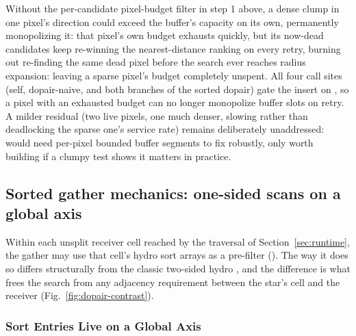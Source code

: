 Without the
per-candidate pixel-budget filter in step 1 above, a dense clump in one
pixel's direction could exceed the buffer's capacity on its own,
permanently monopolizing it: that pixel's own budget exhausts quickly,
but its now-dead candidates keep re-winning the nearest-distance
ranking on every retry, burning out
 re-finding the same dead pixel
before the search ever reaches radius expansion: leaving a sparse
pixel's budget completely unspent. All four
 call sites (self, dopair-naive, and
both branches of the sorted dopair) gate the insert on
, so a
pixel with an exhausted budget can no longer monopolize buffer slots on
retry. A milder residual (two live
pixels, one much denser, slowing rather than deadlocking the sparse
one's service rate) remains deliberately unaddressed: would need
per-pixel bounded buffer segments to fix robustly, only worth building
if a clumpy test shows it matters in practice.

\subsection{Sorted gather mechanics: one-sided scans on a global axis}
\label{sec:sorted-gather}

Within each unsplit receiver cell reached by the traversal of
Section~\ref{sec:runtime}, the gather may use that cell's hydro sort
arrays as a pre-filter
(). The way it
does so differs structurally from the classic two-sided hydro
, and the difference is what frees the search from any
adjacency requirement between the star's cell and the receiver
(Fig.~\ref{fig:dopair-contrast}).

\subsubsection{Sort Entries Live on a Global Axis}

